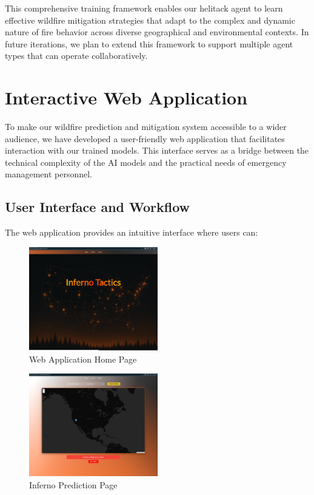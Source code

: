 \documentclass[conference]{IEEEtran}
\begin{document}
\noindent
This comprehensive training framework enables our helitack agent to learn effective wildfire mitigation strategies that adapt to the complex and dynamic nature of fire behavior across diverse geographical and environmental contexts. In future iterations, we plan to extend this framework to support multiple agent types that can operate collaboratively.

\section{Interactive Web Application}

To make our wildfire prediction and mitigation system accessible to a wider audience, we have developed a user-friendly web application that facilitates interaction with our trained models. This interface serves as a bridge between the technical complexity of the AI models and the practical needs of emergency management personnel.



\subsection{User Interface and Workflow}
The web application provides an intuitive interface where users can:

\begin{figure}[H]
    \centering
    \includegraphics[width=0.5\textwidth]{home.png}
    \caption{Web Application Home Page}
    \end{figure}

    \begin{figure}[H]
        \centering
        \includegraphics[width=0.5\textwidth]{inferno.png}
        \caption{Inferno Prediction Page}
        \end{figure}
\end{document}

